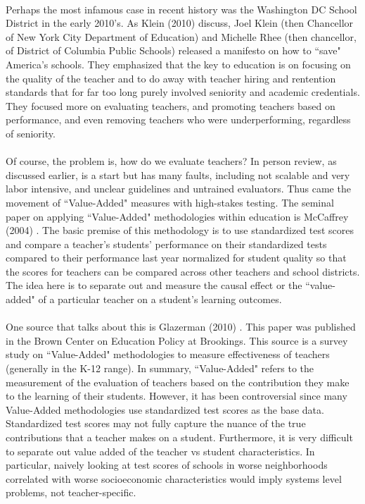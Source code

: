 \documentclass[12pt, final]{article}
\begin{document}
\\
Perhaps the most infamous case in recent history was the Washington DC School District in the early 2010's. As Klein (2010) \cite{Klein} discuss, Joel Klein (then Chancellor of New York City Department of Education) and Michelle Rhee (then chancellor, of District of Columbia Public Schools) released a manifesto on how to ``save" America's schools. They emphasized that the key to education is on focusing on the quality of the teacher and to do away with teacher hiring and rentention standards that for far too long purely involved seniority and academic credentials. They focused more on evaluating teachers, and promoting teachers based on performance, and even removing teachers who were underperforming, regardless of seniority. 
\\
\\
Of course, the problem is, how do we evaluate teachers? In person review, as discussed earlier, is a start but has many faults, including not scalable and very labor intensive, and unclear guidelines and untrained evaluators. Thus came the movement of ``Value-Added" measures with high-stakes testing. The seminal paper on applying ``Value-Added" methodologies within education is McCaffrey (2004) \cite{McCaffrey}. The basic premise of this methodology is to use standardized test scores and compare a teacher's students' performance on their standardized tests compared to their performance last year normalized for student quality so that the scores for teachers can be compared across other teachers and school districts. The idea here is to separate out and measure the causal effect or the ``value-added" of a particular teacher on a student's learning outcomes.
\\
\\
One source that talks about this is Glazerman (2010) \cite{Glazerman}. This paper was published in the Brown Center on Education Policy at Brookings. This source is a survey study on ``Value-Added" methodologies to measure effectiveness of teachers (generally in the K-12 range). In summary, ``Value-Added" refers to the measurement of the evaluation of teachers based on the contribution they make to the learning of their students. However, it has been controversial since many Value-Added methodologies use standardized test scores as the base data. Standardized test scores may not fully capture the nuance of the true contributions that a teacher makes on a student. Furthermore, it is very difficult to separate out value added of the teacher vs student characteristics. In particular, naively looking at test scores of schools in worse neighborhoods correlated with worse socioeconomic characteristics would imply systems level problems, not teacher-specific.
\end{document}
